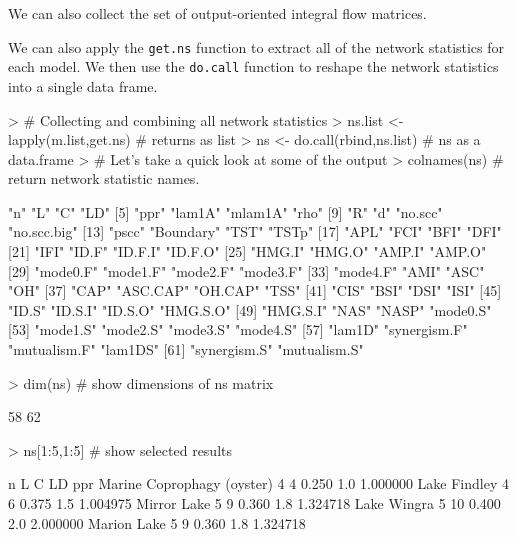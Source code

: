 \documentclass[11pt]{article}
\begin{document}
We can also collect the set of output-oriented integral flow matrices.
\begin{Schunk}
\end{Schunk}

We can also apply the \texttt{get.ns} function to extract all of the
network statistics for each model.  We then use the \texttt{do.call}
function to reshape the network statistics into a single data frame.

\begin{Schunk}
\begin{Sinput}
> # Collecting and combining all network statistics
> ns.list <- lapply(m.list,get.ns) # returns as list
> ns <- do.call(rbind,ns.list)  # ns as a data.frame
> # Let's take a quick look at some of the output
> colnames(ns)    # return network statistic names.  
\end{Sinput}
\begin{Soutput}
 [1] "n"           "L"           "C"           "LD"         
 [5] "ppr"         "lam1A"       "mlam1A"      "rho"        
 [9] "R"           "d"           "no.scc"      "no.scc.big" 
[13] "pscc"        "Boundary"    "TST"         "TSTp"       
[17] "APL"         "FCI"         "BFI"         "DFI"        
[21] "IFI"         "ID.F"        "ID.F.I"      "ID.F.O"     
[25] "HMG.I"       "HMG.O"       "AMP.I"       "AMP.O"      
[29] "mode0.F"     "mode1.F"     "mode2.F"     "mode3.F"    
[33] "mode4.F"     "AMI"         "ASC"         "OH"         
[37] "CAP"         "ASC.CAP"     "OH.CAP"      "TSS"        
[41] "CIS"         "BSI"         "DSI"         "ISI"        
[45] "ID.S"        "ID.S.I"      "ID.S.O"      "HMG.S.O"    
[49] "HMG.S.I"     "NAS"         "NASP"        "mode0.S"    
[53] "mode1.S"     "mode2.S"     "mode3.S"     "mode4.S"    
[57] "lam1D"       "synergism.F" "mutualism.F" "lam1DS"     
[61] "synergism.S" "mutualism.S"
\end{Soutput}
\begin{Sinput}
> dim(ns)         # show dimensions of ns matrix
\end{Sinput}
\begin{Soutput}
[1] 58 62
\end{Soutput}
\begin{Sinput}
> ns[1:5,1:5]     # show selected results
\end{Sinput}
\begin{Soutput}
                           n  L     C  LD      ppr
Marine Coprophagy (oyster) 4  4 0.250 1.0 1.000000
Lake Findley               4  6 0.375 1.5 1.004975
Mirror Lake                5  9 0.360 1.8 1.324718
Lake Wingra                5 10 0.400 2.0 2.000000
Marion Lake                5  9 0.360 1.8 1.324718
\end{Soutput}
\end{Schunk}
\end{document}
